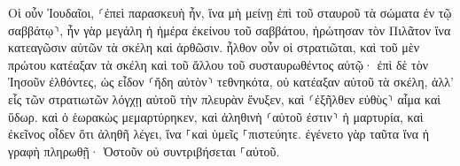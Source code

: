 \documentclass{openreader}
\begin{document}
Οἱ οὖν Ἰουδαῖοι, ⸂ἐπεὶ παρασκευὴ ἦν, ἵνα μὴ μείνῃ ἐπὶ τοῦ σταυροῦ τὰ σώματα ἐν τῷ σαββάτῳ⸃, ἦν γὰρ μεγάλη ἡ ἡμέρα ἐκείνου τοῦ σαββάτου, ἠρώτησαν τὸν Πιλᾶτον ἵνα κατεαγῶσιν αὐτῶν τὰ σκέλη καὶ ἀρθῶσιν. 
ἦλθον οὖν οἱ στρατιῶται, καὶ τοῦ μὲν πρώτου κατέαξαν τὰ σκέλη καὶ τοῦ ἄλλου τοῦ συσταυρωθέντος αὐτῷ· 
ἐπὶ δὲ τὸν Ἰησοῦν ἐλθόντες, ὡς εἶδον ⸂ἤδη αὐτὸν⸃ τεθνηκότα, οὐ κατέαξαν αὐτοῦ τὰ σκέλη, 
ἀλλ’ εἷς τῶν στρατιωτῶν λόγχῃ αὐτοῦ τὴν πλευρὰν ἔνυξεν, καὶ ⸂ἐξῆλθεν εὐθὺς⸃ αἷμα καὶ ὕδωρ. 
καὶ ὁ ἑωρακὼς μεμαρτύρηκεν, καὶ ἀληθινὴ ⸂αὐτοῦ ἐστιν⸃ ἡ μαρτυρία, καὶ ἐκεῖνος οἶδεν ὅτι ἀληθῆ λέγει, ἵνα ⸀καὶ ὑμεῖς ⸀πιστεύητε. 
ἐγένετο γὰρ ταῦτα ἵνα ἡ γραφὴ πληρωθῇ· Ὀστοῦν οὐ συντριβήσεται ⸀αὐτοῦ. 
\end{document}
